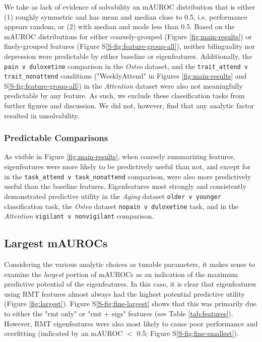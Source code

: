 \documentclass[12pt]{spieman}  %
\newcommand{\code}[1]{\small\texttt{#1}\normalsize}
\begin{document}
\begin{spacing}{2}
We take as lack of evidence of solvability an mAUROC distribution that is
either (1) roughly symmetric and has mean and median close to 0.5, i.e.
performance appears random, or (2) with median and mode less than 0.5. Based on
the mAUROC distributions for either coarsely-grouped (Figure
\ref{fig:main-results}) or finely-grouped features (Figure
S\ref{S-fig:feature-group-all}), neither bilinguality nor depression were
predictable by either baseline or eigenfeatures. Additionally, the \code{pain v
duloxetine} comparison in the \textit{Osteo} dataset, and the
\code{trait\_attend v trait\_nonattend} conditions ("WeeklyAttend" in Figures
\ref{fig:main-results} and S\ref{S-fig:feature-group-all}) in the
\textit{Attention} dataset were also not meaningfully predictable by any
feature. As such, we exclude these classification tasks from further figures
and discussion. We did not, however, find that any analytic factor resulted in
unsolvability.


\subsubsection{Predictable Comparisons}
As visible in Figure \ref{fig:main-results}, when coarsely summarizing
features, eigenfeatures were more likely to be predictively useful than not,
and except for in the \code{task\_attend v task\_nonattend} comparison, were
also more predictively useful than the baseline features.  Eigenfeatures most
strongly and consistently demonstrated predictive utility in the \textit{Aging}
dataset \code{older v younger} classification task, the \textit{Osteo} dataset
\code{nopain v duloxetine} task, and in the \textit{Attention} \code{vigilant v
nonvigilant} comparison.


\subsection{Largest mAUROCs}
\label{sec:unfolding-importance}
Considering the various analytic choices as tunable parameters, it makes sense
to examine the \textit{largest} portion of mAUROCs as an indication of the
maximum predictive potential of the eigenfeatures. In this case, it is clear
that eigenfeatures using RMT features almost always had the highest potential
predictive utility (Figure \ref{fig:largest}). Figure S\ref{S-fig:fine-largest}
shows that this was primarily due to either the "rmt only" or "rmt + eigs"
features (see Table \ref{tab:features}). However, RMT eigenfeatures were also
most likely to cause poor performance and overfitting (indicated by an mAUROC
\(<\) 0.5; Figure S\ref{S-fig:fine-smallest}).


\end{spacing}
\end{document}
